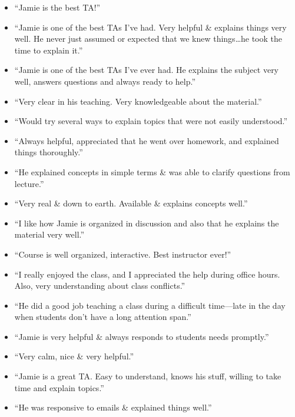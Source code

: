 \documentclass[10pt]{article}
\newenvironment{myItemize}{
  \begin{itemize}
    \setlength{\leftskip}{-4mm}
    \setlength{\itemsep}{0.25em}
    \setlength{\parskip}{0pt}
    \setlength{\parsep}{0.5em}}
  {\end{itemize}}
\begin{document}
\begin{multicols}{2}
\begin{myItemize}
\item ``Jamie is the best TA!''
\item ``Jamie is one of the best TAs I've had. Very
helpful \& explains things very well. He never just assumed or
expected that we knew things\ldots he took the time to explain it.''
\item ``Jamie is one of the best TAs I've ever had. He explains the subject
very well, answers questions and always ready to help.''
\item ``Very clear in his teaching. Very knowledgeable about the material.''
\item ``Would try several ways to explain topics that were not easily
understood.''
\item ``Always helpful, appreciated that he went over homework, and explained things thoroughly.''
\item ``He explained concepts in simple terms \& was able to clarify questions from lecture.''
\item ``Very real \& down to earth. Available \& explains concepts well.''
\item ``I like how Jamie is organized in discussion and also that he explains the material very well.''
\item ``Course is well organized, interactive. Best instructor ever!''
\item ``I really enjoyed the class, and I appreciated the help during office hours. Also, very understanding about class conflicts.''
\item ``He did a good job teaching a class during a difficult time---late in the day when students don't have a long attention span.''
\item ``Jamie is very helpful \& always responds to students needs promptly.''
\item ``Very calm, nice \& very helpful.''
\item ``Jamie is a great TA. Easy to understand, knows his stuff, willing to
take time and explain topics.''
\item ``He was responsive to emails \& explained things well.''
\end{myItemize}


\end{multicols}
\end{document}

